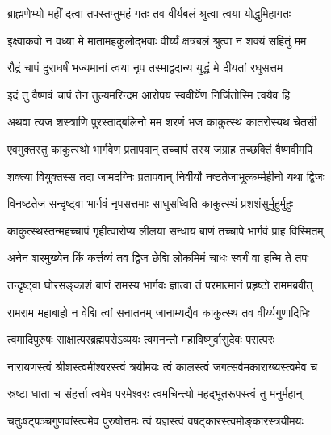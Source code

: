 \twolineshloka
{ब्राह्मणेभ्यो महीं दत्वा तपस्तप्तुमहं गतः}
{तव वीर्यबलं श्रुत्वा त्वया योद्धुमिहागतः}%

\twolineshloka
{इक्ष्वाकवो न वध्या मे मातामहकुलोद्भवाः}
{वीर्य्यं क्षत्रबलं श्रुत्वा न शक्यं सहितुं मम}%

\twolineshloka
{रौद्रं चापं दुराधर्षं भज्यमानां त्वया नृप}
{तस्माद्वदान्य युद्धं मे दीयतां रघुसत्तम}%

\twolineshloka
{इदं तु वैष्णवं चापं तेन तुल्यमरिन्दम}
{आरोपय स्ववीर्येण निर्जितोस्मि त्वयैव हि}%

\twolineshloka
{अथवा त्यज शस्त्राणि पुरस्ताद्बलिनो मम}
{शरणं भज काकुत्स्थ कातरोस्यथ चेतसी}%


\twolineshloka
{एवमुक्तस्तु काकुत्स्थो भार्गवेण प्रतापवान्}
{तच्चापं तस्य जग्राह तच्छक्तिं वैष्णवीमपि}%

\twolineshloka
{शक्त्या वियुक्तस्स तदा जामदग्निः प्रतापवान्}
{निर्वीर्यो नष्टतेजाभूत्कर्म्महीनो यथा द्विजः}%

\twolineshloka
{विनष्टतेज सन्दृष्ट्वा भार्गवं नृपसत्तमाः}
{साधुसध्विति काकुत्स्थं प्रशशंसुर्मुहुर्मुहुः}%

\twolineshloka
{काकुत्स्थस्तन्महच्चापं गृहीत्वारोप्य लीलया}
{सन्धाय बाणं तच्चापे भार्गवं प्राह विस्मितम्}%


\twolineshloka
{अनेन शरमुख्येन किं कर्त्तव्यं तव द्विज}
{छेद्मि लोकमिमं चाधः स्वर्गं वा हन्मि ते तपः}%


\twolineshloka
{तन्दृष्ट्वा घोरसङ्काशं बाणं रामस्य भार्गवः}
{ज्ञात्वा तं परमात्मानं प्रहृष्टो राममब्रवीत्}%


\twolineshloka
{रामराम महाबाहो न वेद्मि त्वां सनातनम्}
{जानाम्यद्यैव काकुत्स्थ तव वीर्य्यगुणादिभिः}%

\twolineshloka
{त्वमादिपुरुषः साक्षात्परब्रह्मपरोऽव्ययः}
{त्वमनन्तो महाविष्णुर्वासुदेवः परात्परः}%

\twolineshloka
{नारायणस्त्वं श्रीशस्त्वमीश्वरस्त्वं त्रयीमयः}
{त्वं कालस्त्वं जगत्सर्वमकाराख्यस्त्वमेव च}%

\twolineshloka
{स्रष्टा धाता च संहर्त्ता त्वमेव परमेश्वरः}
{त्वमचिन्त्यो महद्भूतरूपस्त्वं तु मनुर्महान्}%

\twolineshloka
{चतुःषट्पञ्चगुणवांस्त्वमेव पुरुषोत्तमः}
{त्वं यज्ञस्त्वं वषट्कारस्त्वमोङ्कारस्त्रयीमयः}%

